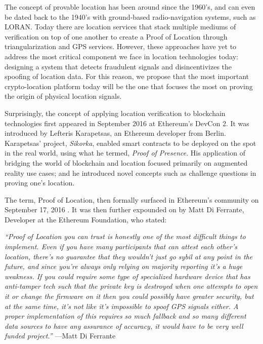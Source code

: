 \documentclass{article}
\begin{document}
The concept of provable location has been around since the 1960's, and can even be dated back to the 1940's with ground-based radio-navigation systems, such as LORAN. Today there are location services that stack multiple mediums of verification on top of one another to create a Proof of Location through triangularization and GPS services. However, these approaches have yet to address the most critical component we face in location technologies today: designing a system that detects fraudulent signals and disincentivizes the spoofing of location data. For this reason, we propose that the most important crypto-location platform today will be the one that focuses the most on proving the origin of physical location signals.

Surprisingly, the concept of applying location verification to blockchain technologies first appeared in September 2016 at Ethereum's DevCon 2. It was introduced by Lefteris Karapetsas, an Ethereum developer from Berlin. Karapetsas' project, \textit{Sikorka}, enabled smart contracts to be deployed on the spot in the real world, using what he termed, \textit{Proof of Presence}. His application of bridging the world of blockchain and location focused primarily on augmented reality use cases; and he introduced novel concepts such as challenge questions in proving one's location.

The term, Proof of Location, then formally surfaced in Ethereum's community on September 17, 2016 \cite{diferrante-proofoflocation}. It was then further expounded on by Matt Di Ferrante, Developer at the Ethereum Foundation, who stated:

\begin{displayquote}\textit{``Proof of Location you can trust is honestly one of the most difficult things to implement. Even if you have many participants that can attest each other's location, there's no guarantee that they wouldn't just go sybil at any point in the future, and since you're always only relying on majority reporting it's a huge weakness.
If you could require some type of specialized hardware device that has anti-tamper tech such that the private key is destroyed when one attempts to open it or change the firmware on it then you could possibly have greater security, but at the same time, it's not like it's impossible to spoof GPS signals either.
A proper implementation of this requires so much fallback and so many different data sources to have any assurance of accuracy, it would have to be very well funded project.''}
\vspace{2mm}
---Matt Di Ferrante
\end{displayquote}
\end{document}
